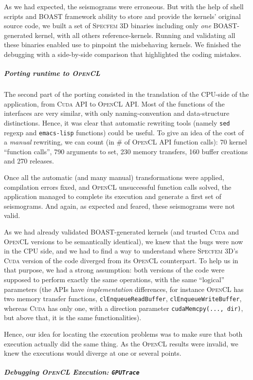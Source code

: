 \documentclass[11pt, a4paper, twoside]{montblanc}
\newcommand{\productname}[1]{\textsc{#1}}
\newcommand{\Specfem}{\productname{Specfem 3D}\xspace}
\newcommand{\Cuda}{\productname{Cuda}\xspace}
\newcommand{\OCL}{\productname{OpenCL}\xspace}
\newcommand{\code}[1]{\texttt{#1}}
\begin{document}
As we had expected, the seismograms were erroneous. But with the help
of shell scripts and BOAST framework ability to store and provide the
kernels' original source code, we built a set of \Specfem binaries
including only \emph{one} BOAST-generated kernel, with all others
reference-kernels. Running and validating all these binaries enabled
use to pinpoint the misbehaving kernels. We finished the debugging
with a side-by-side comparison that highlighted the coding mistakes.

\subparagraph{Porting runtime to \OCL} The second part of the porting
consisted in the translation of the CPU-side of the application, from
\Cuda API to \OCL API. Most of the functions of the interfaces are
very similar, with only naming-convention and data-structure
distinctions. Hence, it was clear that automatic rewriting tools
(namely \code{sed} regexp and \code{emacs-lisp} functions) could be
useful. To give an idea of the cost of a \emph{manual} rewriting, we
can count (in \# of \OCL API function calls): 70 kernel ``function
calls'', 790 arguments to set, 230 memory transfers, 160 buffer
creations and 270 releases.

Once all the automatic (and many manual) transformations were applied,
compilation errors fixed, and \OCL unsuccessful function calls solved,
the application managed to complete its execution and generate a first
set of seismograms. And again, as expected and feared, these
seismograms were not valid.

As we had already validated BOAST-generated kernels (and trusted \Cuda
and \OCL versions to be semantically identical), we knew that the bugs
were now in the CPU side, and we had to find a way to understand where
\Specfem's \Cuda version of the code diverged from its \OCL
counterpart. To help us in that purpose, we had a strong assumption:
both versions of the code were supposed to perform exactly the same
operations, with the same ``logical'' parameters (the APIs have
\emph{implementation} differences, for instance \OCL has two memory
transfer functions, \code{clEnqueueReadBuffer},
\code{clEnqueueWriteBuffer}, whereas \Cuda has only one, with a
direction parameter \code{cudaMemcpy(..., dir)}, but above that, it is
the same functionalities).

Hence, our idea for locating the execution problems was to make sure
that both execution actually did the same thing. As the \OCL results
were invalid, we knew the executions would diverge at one or several
points.

\subparagraph{Debugging \OCL Execution: \code{GPUTrace}} 
\end{document}
